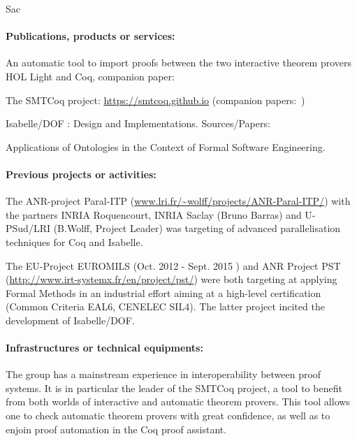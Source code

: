 \begin{sitedescription}{Sac}
\paragraph{Publications, products or services:}

\begin{compactitem}
\item An automatic tool to import proofs between the two interactive
  theorem provers HOL Light and Coq, companion
  paper:~\cite{DBLP:conf/itp/KellerW10}
\item The SMTCoq project: \url{https://smtcoq.github.io} (companion
  papers:~\cite{DBLP:conf/cpp/ArmandFGKTW11,DBLP:conf/cav/EkiciMTKKRB17})
\item Isabelle/DOF : Design and Implementations.
 Sources/Papers: \cite{brucker_achim_d_2019_3370483,brucker.ea:isabelle-ontologies:2018}
\item Applications of Ontologies in the Context of Formal Software Engineering.
 \cite{brucker.ea:ontologies-certification:2019}
\end{compactitem}

\paragraph{Previous projects or activities:}

\begin{compactitem}
\item The ANR-project Paral-ITP (\url{www.lri.fr/~wolff/projects/ANR-Paral-ITP/}) with the  
      partners INRIA Roquencourt, INRIA Saclay (Bruno Barras) 
      and U-PSud/LRI (B.Wolff, Project Leader) was targeting 
      of advanced parallelisation techniques for Coq and Isabelle.
\item The EU-Project EUROMILS (Oct. 2012 - Sept. 2015 ) and 
      ANR Project PST (\url{http://www.irt-systemx.fr/en/project/pst/})
      were both targeting at applying Formal Methods in an industrial
      effort aiming at a high-level certification (Common Criteria EAL6, 
      CENELEC SIL4). The latter project incited the development of 
      Isabelle/DOF\cite{brucker_achim_d_2019_3370483}.
\end{compactitem} 

\paragraph{Infrastructures or technical equipments:}

The group has a mainstream experience in interoperability between proof
systems. It is in particular the leader of the SMTCoq project, a tool to
benefit from both worlds of interactive and automatic theorem provers.
This tool allows one to check automatic theorem provers with great
confidence, as well as to enjoin proof automation in the Coq proof
assistant.


\end{sitedescription}
